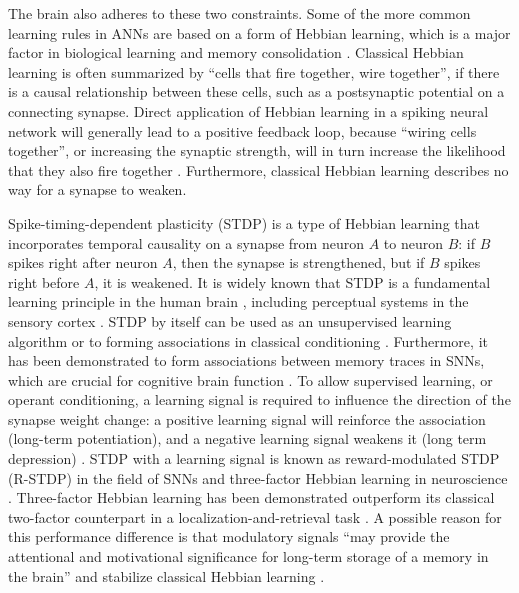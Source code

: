 The brain also adheres to these two constraints.
Some of the more common learning rules in ANNs are based on a form of Hebbian learning, which is a major factor in biological learning and memory consolidation \citep{schuman2017survey}.
Classical Hebbian learning is often summarized by ``cells that fire together, wire together'', if there is a causal relationship between these cells, such as a postsynaptic potential on a connecting synapse.
Direct application of Hebbian learning in a spiking neural network will generally lead to a positive feedback loop, because ``wiring cells together'', or increasing the synaptic strength, will in turn increase the likelihood that they also fire together \citep{zenke2017temporal}.
Furthermore, classical Hebbian learning describes no way for a synapse to weaken.

Spike-timing-dependent plasticity (STDP) \citep{abbott2000synaptic,caporale2008spike} is a type of Hebbian learning that incorporates temporal causality on a synapse from neuron $A$ to neuron $B$: if $B$ spikes right after neuron $A$, then the synapse is strengthened, but if $B$ spikes right before $A$, it is weakened.
It is widely known that STDP is a fundamental learning principle in the human brain \citep{kandel2000principles,caporale2008spike}, including perceptual systems in the sensory cortex \citep{huang2014associative}.
STDP by itself can be used as an unsupervised learning algorithm or to forming associations in classical conditioning \citep{diehl2015unsupervised,kim2018demonstration}.
Furthermore, it has been demonstrated to form associations between memory traces in SNNs, which are crucial for cognitive brain function \citep{pokorny2020stdp}.
To allow supervised learning, or operant conditioning, a learning signal is required to influence the direction of the synapse weight change: a positive learning signal will reinforce the association (long-term potentiation), and a negative learning signal weakens it (long term depression) \citep{lobov2020spatial}.
STDP with a learning signal is known as reward-modulated STDP (R-STDP) \citep{legenstein2008learning} in the field of SNNs and three-factor Hebbian learning in neuroscience \citep{fremaux2016neuromodulated}.
Three-factor Hebbian learning has been demonstrated outperform its classical two-factor counterpart in a localization-and-retrieval task \citep{porr2007learning}.
A possible reason for this performance difference is that modulatory signals ``may provide the attentional and motivational significance for long-term storage of a memory in the brain'' and stabilize classical Hebbian learning \citep{bailey2000heterosynaptic}.


